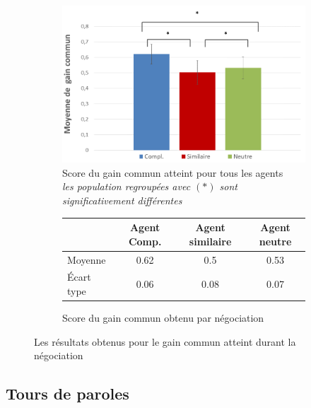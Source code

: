 		\begin{figure}[h]

			\begin{subfigure}[h]{0.8\textwidth}
			\centering
			\includegraphics[clip=false]{Figures/chap7/gainCommun.PNG}
			\caption{Score du gain commun atteint pour tous les agents  \\ \textit{les population regroupées avec $(*)$ sont significativement différentes }}
		\end{subfigure}
		
		\begin{subfigure}[h]{0.8\textwidth}
			\centering
			\begin{tabular}{l c c c}
			\hline
			\textbf{ }& \textbf{Agent Comp.} & \textbf{Agent similaire} & \textbf{Agent neutre} \\ 
			\hline
			\newline Moyenne & 0.62& 0.5 & 0.53 \\
			\newline Écart type & 0.06 & 0.08 & 0.07 \\
			\hline
				
			\end{tabular}
			\caption{Score du gain commun obtenu par négociation}
		\end{subfigure}
				\caption{Les résultats obtenus pour le gain commun atteint durant la négociation}
				\label{fig:gain}
	\end{figure}
	
	\subsection{Tours de paroles}
			
